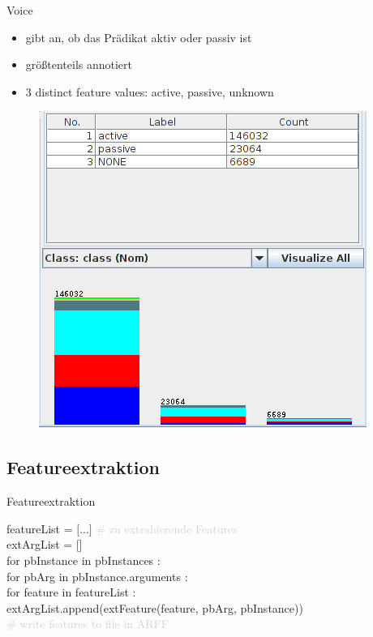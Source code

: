 \documentclass[10pt]{beamer}
\begin{document}
  \begin{frame}{Voice}
   \begin{itemize}
    \item gibt an, ob das Prädikat aktiv oder passiv ist
    \item größtenteils annotiert
    \item 3 distinct feature values: active, passive, unknown
   \end{itemize}
  \begin{figure}
	  \begin{center}
	  	\includegraphics[scale=0.3]{voice}
	  \end{center}
  \end{figure}
  \end{frame}
  



\subsection{Featureextraktion}

\begin{frame}{Featureextraktion} 
\begin{footnotesize}
\hspace{10pt} featureList = $[$...$]$ \textcolor{lightgray}{\# zu extrahierende Features} \\
\hspace{10pt} extArgList = [] \\
\hspace{10pt} for pbInstance in pbInstances : \\
\hspace{30pt} 	for pbArg in pbInstance.arguments : \\
\hspace{40pt} 	for feature in featureList : \\
\hspace{50pt}		extArgList.append(extFeature(feature, pbArg, pbInstance)) \\
\hspace{10pt}   	\textcolor{lightgray}{ \# write features to file in ARFF} \\
\end{footnotesize}
\end{frame}
\end{document}
